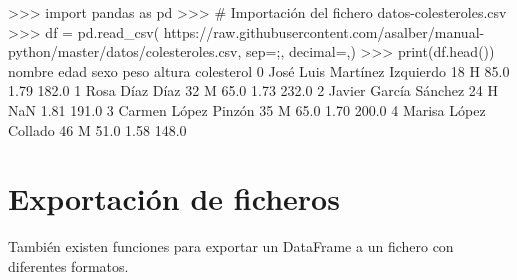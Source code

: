\documentclass[
  spanish,
  a4paper,
]{scrreport}
\newenvironment{Shaded}{\begin{snugshade}}{\end{snugshade}}
\newcommand{\BuiltInTok}[1]{\textcolor[rgb]{0.00,0.23,0.31}{#1}}
\newcommand{\CommentTok}[1]{\textcolor[rgb]{0.37,0.37,0.37}{#1}}
\newcommand{\DecValTok}[1]{\textcolor[rgb]{0.68,0.00,0.00}{#1}}
\newcommand{\FloatTok}[1]{\textcolor[rgb]{0.68,0.00,0.00}{#1}}
\newcommand{\ImportTok}[1]{\textcolor[rgb]{0.00,0.46,0.62}{#1}}
\newcommand{\NormalTok}[1]{\textcolor[rgb]{0.00,0.23,0.31}{#1}}
\newcommand{\OperatorTok}[1]{\textcolor[rgb]{0.37,0.37,0.37}{#1}}
\newcommand{\StringTok}[1]{\textcolor[rgb]{0.13,0.47,0.30}{#1}}
\begin{document}
\begin{Shaded}
\begin{Highlighting}[]
\OperatorTok{\textgreater{}\textgreater{}\textgreater{}} \ImportTok{import}\NormalTok{ pandas }\ImportTok{as}\NormalTok{ pd}
\OperatorTok{\textgreater{}\textgreater{}\textgreater{}} \CommentTok{\# Importación del fichero datos{-}colesteroles.csv}
\OperatorTok{\textgreater{}\textgreater{}\textgreater{}}\NormalTok{ df }\OperatorTok{=}\NormalTok{ pd.read\_csv(}
\StringTok{\textquotesingle{}https://raw.githubusercontent.com/asalber/manual{-}python/master/datos/colesteroles.csv\textquotesingle{}}\NormalTok{, sep}\OperatorTok{=}\StringTok{\textquotesingle{};\textquotesingle{}}\NormalTok{, decimal}\OperatorTok{=}\StringTok{\textquotesingle{},\textquotesingle{}}\NormalTok{)}
\OperatorTok{\textgreater{}\textgreater{}\textgreater{}} \BuiltInTok{print}\NormalTok{(df.head())}
\NormalTok{                              nombre  edad sexo    peso    altura  colesterol}
\DecValTok{0}\NormalTok{       José Luis Martínez Izquierdo    }\DecValTok{18}\NormalTok{    H    }\FloatTok{85.0}    \FloatTok{1.79}         \FloatTok{182.0}
\DecValTok{1}\NormalTok{                     Rosa Díaz Díaz    }\DecValTok{32}\NormalTok{    M    }\FloatTok{65.0}    \FloatTok{1.73}         \FloatTok{232.0}
\DecValTok{2}\NormalTok{              Javier García Sánchez    }\DecValTok{24}\NormalTok{    H     NaN    }\FloatTok{1.81}         \FloatTok{191.0}
\DecValTok{3}\NormalTok{                Carmen López Pinzón    }\DecValTok{35}\NormalTok{    M    }\FloatTok{65.0}    \FloatTok{1.70}         \FloatTok{200.0}
\DecValTok{4}\NormalTok{               Marisa López Collado    }\DecValTok{46}\NormalTok{    M    }\FloatTok{51.0}    \FloatTok{1.58}         \FloatTok{148.0}
\end{Highlighting}
\end{Shaded}

\section{Exportación de ficheros}\label{exportaciuxf3n-de-ficheros}

También existen funciones para exportar un DataFrame a un fichero con
diferentes formatos.
\end{document}
